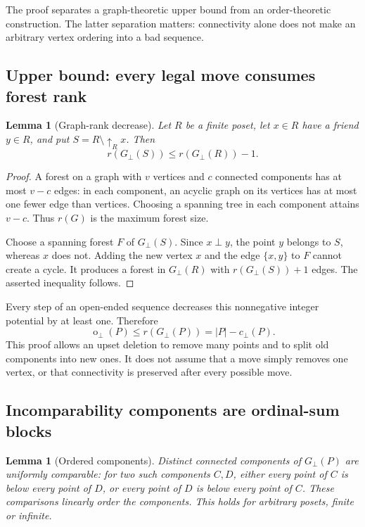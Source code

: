 \documentclass[11pt,a4paper]{article}
\newtheorem{lemma}[theorem]{Lemma}
\theoremstyle{definition}
\theoremstyle{remark}
\newcommand{\fot}{\operatorname{o}_{\perp}}
\newcommand{\incg}{G_{\perp}}
\newcommand{\cc}{c_{\perp}}
\begin{document}
The proof separates a graph-theoretic upper bound from an order-theoretic
construction. The latter separation matters: connectivity alone does not
make an arbitrary vertex ordering into a bad sequence.

\subsection{Upper bound: every legal move consumes forest rank}

\begin{lemma}[Graph-rank decrease]\label{lem:potential}
Let $R$ be a finite poset, let $x\in R$ have a friend $y\in R$, and put
$S=R\setminus\uparrow_R x$. Then
\[
 r(\incg(S))\le r(\incg(R))-1.
\]
\end{lemma}

\begin{proof}
A forest on a graph with $v$ vertices and $c$ connected components has at
most $v-c$ edges: in each component, an acyclic graph on its vertices has at
most one fewer edge than vertices. Choosing a spanning tree in each
component attains $v-c$. Thus $r(G)$ is the maximum forest size.

Choose a spanning forest $F$ of $\incg(S)$. Since $x\perp y$, the point $y$
belongs to $S$, whereas $x$ does not. Adding the new vertex $x$ and the edge
$\{x,y\}$ to $F$ cannot create a cycle. It produces a forest in $\incg(R)$
with $r(\incg(S))+1$ edges. The asserted inequality follows.
\end{proof}

Every step of an open-ended sequence decreases this nonnegative integer
potential by at least one. Therefore
\begin{equation}\label{eq:upper}
 \fot(P)\le r(\incg(P))=|P|-\cc(P).
\end{equation}
This proof allows an upset deletion to remove many points and to split old
components into new ones. It does not assume that a move simply removes one
vertex, or that connectivity is preserved after every possible move.

\subsection{Incomparability components are ordinal-sum blocks}

\begin{lemma}[Ordered components]\label{lem:components}
Distinct connected components of $\incg(P)$ are uniformly comparable:
for two such components $C,D$, either every point of $C$ is below every
point of $D$, or every point of $D$ is below every point of $C$.
These comparisons linearly order the components. This holds for arbitrary
posets, finite or infinite.
\end{lemma}
\end{document}

